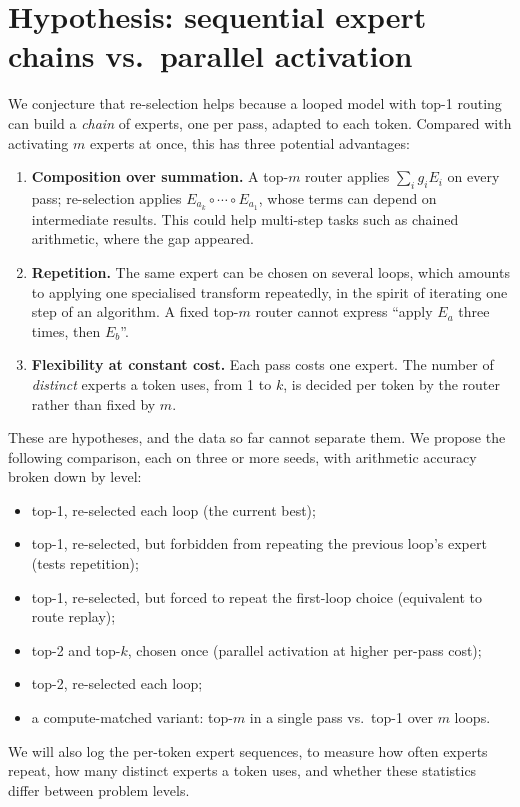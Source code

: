 \documentclass[11pt]{article}
\begin{document}
\section{Hypothesis: sequential expert chains vs.\ parallel activation}
\label{sec:hyp}
We conjecture that re-selection helps because a looped model with top-1 routing can build a \emph{chain} of experts, one per pass, adapted to each token. Compared with activating $m$ experts at once, this has three potential advantages:
\begin{enumerate}\setlength\itemsep{1pt}
\item \textbf{Composition over summation.} A top-$m$ router applies $\sum_i g_i E_i$ on every pass; re-selection applies $E_{a_k}\circ\cdots\circ E_{a_1}$, whose terms can depend on intermediate results. This could help multi-step tasks such as chained arithmetic, where the gap appeared.
\item \textbf{Repetition.} The same expert can be chosen on several loops, which amounts to applying one specialised transform repeatedly, in the spirit of iterating one step of an algorithm. A fixed top-$m$ router cannot express ``apply $E_a$ three times, then $E_b$''.
\item \textbf{Flexibility at constant cost.} Each pass costs one expert. The number of \emph{distinct} experts a token uses, from 1 to $k$, is decided per token by the router rather than fixed by $m$.
\end{enumerate}
These are hypotheses, and the data so far cannot separate them. We propose the following comparison, each on three or more seeds, with arithmetic accuracy broken down by level:
\begin{itemize}\setlength\itemsep{1pt}
\item top-1, re-selected each loop (the current best);
\item top-1, re-selected, but forbidden from repeating the previous loop's expert (tests repetition);
\item top-1, re-selected, but forced to repeat the first-loop choice (equivalent to route replay);
\item top-2 and top-$k$, chosen once (parallel activation at higher per-pass cost);
\item top-2, re-selected each loop;
\item a compute-matched variant: top-$m$ in a single pass vs.\ top-1 over $m$ loops.
\end{itemize}
We will also log the per-token expert sequences, to measure how often experts repeat, how many distinct experts a token uses, and whether these statistics differ between problem levels.
\end{document}
